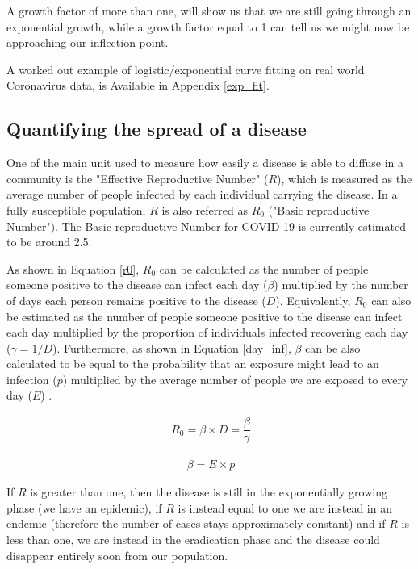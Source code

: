 A growth factor of more than one, will show us that we are still going through an exponential growth, while a growth factor equal to 1 can tell us we might now be approaching our inflection point.

A worked out example of logistic/exponential curve fitting on real world Coronavirus data, is Available in Appendix \ref{exp_fit}.

\subsection{Quantifying the spread of a disease}
One of the main unit used to measure how easily a disease is able to diffuse in a community is the "Effective Reproductive Number" ($R$), which is measured as the average number of people infected by each individual carrying the disease. In a fully susceptible population, $R$ is also referred as $R_{0}$ ("Basic reproductive Number"). The Basic reproductive Number for COVID-19 is currently estimated to be around 2.5.

As shown in Equation \ref{r0}, $R_{0}$ can be calculated as the number of people someone positive to the disease can infect each day ($\beta$) multiplied by the number of days each person remains positive to the disease ($D$). Equivalently, $R_{0}$ can also be estimated as the number of people someone positive to the disease can infect each day multiplied by the proportion of individuals infected recovering each day ($\gamma = 1/D$). Furthermore, as shown in Equation \ref{day_inf}, $\beta$ can be also calculated to be equal to the probability that an exposure might lead to an infection ($p$) multiplied by the average number of people we are exposed to every day ($E$) \cite{tds}.

\useshortskip
\begin{align}
\ R_{0} = \beta \times D = \dfrac{\beta}{\gamma}
\label{r0}
\end{align}
\useshortskip

\useshortskip
\begin{align}
\ \beta = E \times p
\label{day_inf}
\end{align}
\useshortskip

If $R$ is greater than one, then the disease is still in the exponentially growing phase (we have an epidemic), if $R$ is instead equal to one we are instead in an endemic (therefore the number of cases stays approximately constant) and if $R$ is less than one, we are instead in the eradication phase and the disease could disappear entirely soon from our population.


